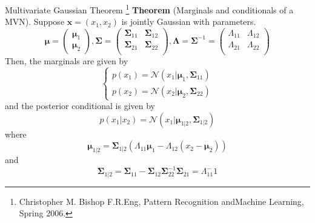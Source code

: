 \documentclass[10pt]{beamer}
\begin{document}
\begin{frame}[fragile]{Multivariate Gaussian Theorem \footnote{Christopher M. Bishop F.R.Eng, Pattern Recognition andMachine Learning, Spring 2006.}} 
	\textbf{Theorem} (Marginals and conditionals of a MVN). Suppose $\mathbf{x} = (x_1, x_2)$ is jointly Gaussian with parameters. 
	$$ \bm{\mu} = \left(\begin{array}{r}
		\bm{\mu}_1\\ 
		\bm{\mu}_2 
	\end{array}\right), \bm{\Sigma} = \left(\begin{array}{rr}
		\bm{\Sigma}_{11}& \bm{\Sigma}_{12}\\ 
		\bm{\Sigma}_{21}& \bm{\Sigma}_{22}\\ 
	\end{array}\right), \bm{\Lambda} = \bm{\Sigma} ^{-1} = \left(\begin{array}{rr}
		\Lambda_{11}& \Lambda_{12}\\ 
		\Lambda_{21}& \Lambda_{22}\\ 
	\end{array}\right)$$
	Then, the marginals are given by 
	$$ \begin{cases}
		p(x_1) = \mathcal{N}(x_1| \bm{\mu}_1, \bm{\Sigma} _{11}) \\ 
		p(x_2) = \mathcal{N}(x_2|\bm{\mu}_2,\bm{\Sigma} _{22})
	\end{cases}$$
	and the posterior conditional is given by
	$$ p(x_1| x_2) = \mathcal{N} (x_1| \bm{\mu}_{1|2}, \bm{\Sigma} _{1|2})$$
	where $$\bm{\mu}_{1|2} =\bm{\Sigma}_{1|2} (\Lambda_{11} \bm{\mu}_1 - \Lambda_{12}(x_2 - \bm{\mu}_2))$$ and $$\bm{\Sigma} _{1|2} = \bm{\Sigma}_{11} -\bm{\Sigma}_{12}\bm{\Sigma} _{22}^{-1} \bm{\Sigma}_{21} = \Lambda_{11}^-1$$
\end{frame}
\end{document}
